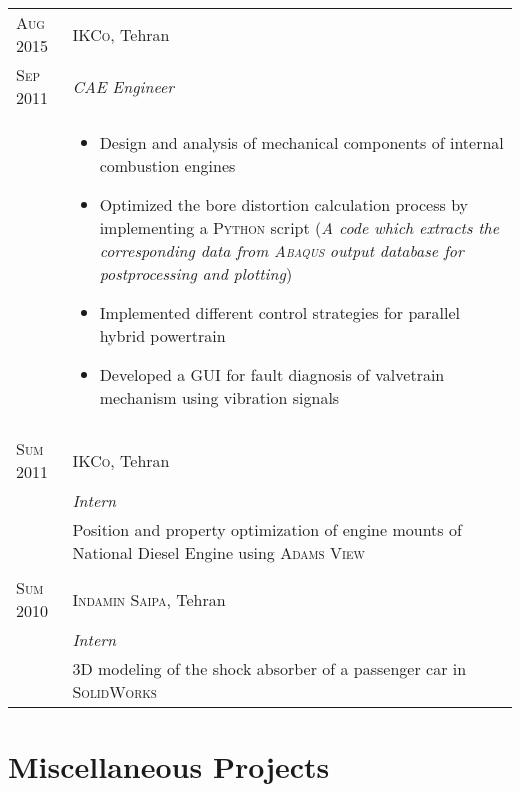 \documentclass[a4paper,9pt]{article}
\begin{document}
\begin{longtable}{p{1.7cm}|p{13.3cm}}
 
 \textsc{Aug 2015} & \textsc{IKCo}, Tehran \\
 \textsc{Sep 2011}&\emph{CAE Engineer}\\
 &
 \begin{itemize}[leftmargin=*]
 \item{\footnotesize{Design and analysis of mechanical components of internal combustion engines }}
 
 \item{\footnotesize{Optimized the bore distortion calculation process by implementing a \textsc{Python} script (\textit{A code which extracts the corresponding data from \textsc{Abaqus} output database for postprocessing and plotting})}}
 
 \item{\footnotesize{Implemented different control strategies for parallel hybrid powertrain}}
 
 \item{\footnotesize{Developed a GUI for fault diagnosis of valvetrain mechanism using vibration signals}}
 
\end{itemize}\\
 
\multicolumn{2}{c}{} \\
 
 


\textsc{Sum 2011} & \textsc{IKCo}, Tehran\\
&\emph{Intern}\\
&\footnotesize{Position and property optimization of engine mounts of National Diesel Engine using \textsc{Adams View}}\\
\multicolumn{2}{c}{}\\

\textsc{Sum 2010} & \textsc{Indamin Saipa}, Tehran\\
&\emph{Intern}\\
&\footnotesize{3D modeling of the shock absorber of a passenger car in \textsc{SolidWorks}}
\end{longtable}


\section*{Miscellaneous Projects}
\end{document}
